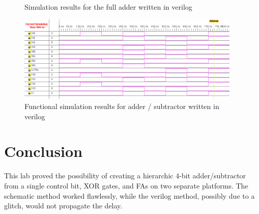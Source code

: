 \documentclass[11pt]{article}
\begin{document}
\begin{figure}[htpb]
	\centering
	\caption{Simulation results for the full adder written in verilog}
	\label{fig:FA_verilog}
\end{figure}

\begin{figure}[htpb]
	\centering
	\includegraphics[width=0.95\textwidth]{add_sub_test_verilog}
	\caption{Functional simulation results for adder / subtractor written in verilog}
	\label{fig:AS_verilog}
\end{figure}

\pagebreak
\section{Conclusion}

This lab proved the possibility of creating a hierarchic 4-bit adder/subtractor from a single control bit, XOR gates, and FAs on two separate platforms. The schematic method worked flawlessly, while the verilog method, possibly due to a glitch, would not propagate the delay.
\end{document}

